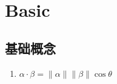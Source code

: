 \documentclass[a4paper,12pt]{article}
\begin{document}



    \section{Basic}

    \subsection{基础概念}

    \begin{enumerate}
        \item $\alpha \cdot \beta = \|\alpha\| \|\beta\| \cos\theta$
    \end{enumerate}
\end{document}
